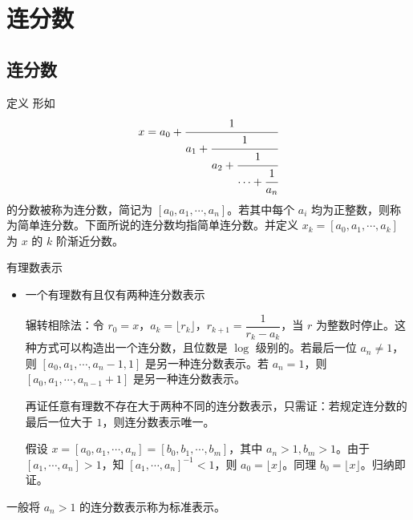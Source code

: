 \documentclass [hyperref={bookmarksdepth=4}, aspectratio=169] {beamer}
\theoremstyle {fy}
\begin{document}
\section{连分数}

\subsection{连分数}

\begin{frame}{定义}
形如
$$
x = a_0 + \cfrac{1}{a_1 + \cfrac{1}{a_2 +\cfrac{1}{\cdots+\cfrac{1}{a_n}}}}
$$
的分数被称为连分数，简记为 $[a_0,a_1,\cdots,a_n]$。若其中每个 $a_i$ 均为正整数，则称为简单连分数。下面所说的连分数均指简单连分数。并定义 $x_k=[a_0,a_1,\cdots,a_k]$ 为 $x$ 的 $k$ 阶渐近分数。
\end{frame}

\begin{frame}{有理数表示}
\begin{itemize}
    \item 一个有理数有且仅有两种连分数表示

  辗转相除法：令 $r_0=x$，$a_k=\lfloor r_k\rfloor$，$r_{k+1}=\dfrac{1}{r_k-a_k}$，当 $r$ 为整数时停止。这种方式可以构造出一个连分数，且位数是 $\log$ 级别的。若最后一位 $a_n\neq 1$，则 $[a_0,a_1,\cdots,a_n-1,1]$ 是另一种连分数表示。若 $a_n=1$，则 $[a_0,a_1,\cdots,a_{n-1}+1]$ 是另一种连分数表示。

  再证任意有理数不存在大于两种不同的连分数表示，只需证：若规定连分数的最后一位大于 $1$，则连分数表示唯一。

  假设 $x=[a_0,a_1,\cdots,a_n]=[b_0,b_1,\cdots,b_m]$，其中 $a_n>1,b_m>1$。由于 $[a_1,\cdots,a_n]>1$，知 $[a_1,\cdots,a_n]^{-1}<1$，则 $a_0=\lfloor x\rfloor$。同理 $b_0=\lfloor x\rfloor$。归纳即证。
\end{itemize}

一般将 $a_n>1$ 的连分数表示称为标准表示。
\end{frame}
\end{document}
